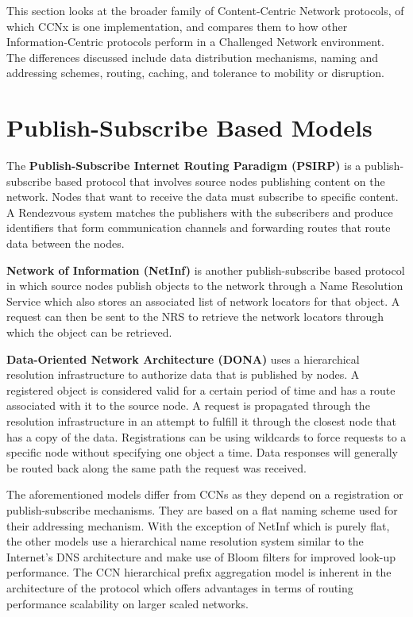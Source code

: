 \documentclass[a4paper,12pt]{report}      %
\begin{document}
This section looks at the broader family of Content-Centric Network protocols, of which CCNx is one
implementation, and compares them to how other Information-Centric protocols perform in a
Challenged Network environment. The differences discussed include data distribution mechanisms,
naming and addressing schemes, routing, caching, and tolerance to mobility or disruption.\cite{dirk2941}

\section{Publish-Subscribe Based Models}

The \textbf{Publish-Subscribe Internet Routing Paradigm (PSIRP)} is a publish-subscribe based protocol
that involves source nodes publishing content on the network. Nodes that want to receive the data must
subscribe to specific content. A Rendezvous system matches the publishers with the subscribers and
produce identifiers that form communication channels and forwarding routes that route data between
the nodes.

\textbf{Network of Information (NetInf)} is another publish-subscribe based protocol in which source nodes
publish objects to the network through a Name Resolution Service which also stores an associated list
of network locators for that object. A request can then be sent to the NRS to retrieve the network
locators through which the object can be retrieved.

\textbf{Data-Oriented Network Architecture (DONA)} uses a hierarchical resolution infrastructure to
authorize data that is published by nodes. A registered object is considered valid for a certain period of
time and has a route associated with it to the source node. A request is propagated through the
resolution infrastructure in an attempt to fulfill it through the closest node that has a copy of the data.
Registrations can be using wildcards to force requests to a specific node without specifying one object
a time. Data responses will generally be routed back along the same path the request was received.

The aforementioned models differ from CCNs as they depend on a registration or publish-subscribe
mechanisms. They are based on a flat naming scheme used for their addressing mechanism. With the
exception of NetInf which is purely flat, the other models use a hierarchical name resolution system
similar to the Internet's DNS architecture and make use of Bloom filters for improved look-up
performance. The CCN hierarchical prefix aggregation model is inherent in the architecture of the
protocol which offers advantages in terms of routing performance scalability on larger scaled networks.
\end{document}
